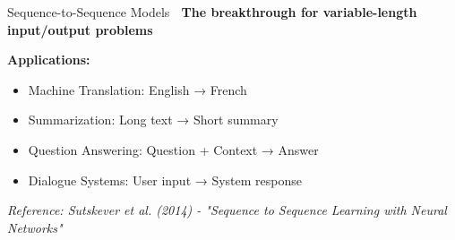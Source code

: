\documentclass[aspectratio=169]{beamer}
\begin{document}
\begin{frame}[shrink=5]{Sequence-to-Sequence Models 🔄}
\textbf{The breakthrough for variable-length input/output problems}

\vspace{1em}

\textbf{Applications:}
\begin{itemize}\setlength{\itemsep}{0pt}
    \item Machine Translation: English → French
    \item Summarization: Long text → Short summary
    \item Question Answering: Question + Context → Answer
    \item Dialogue Systems: User input → System response
\end{itemize}

\vspace{1em}

\begin{center}
\end{center}

\vspace{1em}
\small
\textit{Reference: Sutskever et al. (2014) - "Sequence to Sequence Learning with Neural Networks"}
\end{frame}
\end{document}
